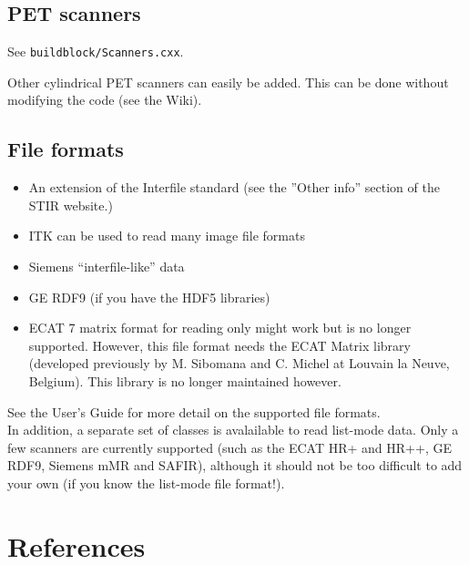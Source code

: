 \documentclass{article}
\begin{document}
\subsection{
PET scanners}
See \texttt{buildblock/Scanners.cxx}.

Other cylindrical PET scanners can easily be added. This can be done
without modifying the code (see the Wiki).


\subsection{
File formats}
\begin{itemize}
\item 
An extension of the Interfile standard (see the ''Other info'' section of the STIR website.)
\item
ITK can be used to read many image file formats
\item Siemens ``interfile-like'' data
\item GE RDF9 (if you have the HDF5 libraries)
\item 
ECAT 7 matrix format for reading only might work but is no longer supported.
However, this file format needs the ECAT Matrix library (developed 
previously by M. Sibomana and C. Michel at Louvain la Neuve, Belgium).
This library is no longer maintained however.
\end{itemize}

See the User's Guide for more detail on the supported file formats.\\
In addition, a separate set of classes is avalailable
to read list-mode 
data. Only a few scanners are currently supported (such as the 
ECAT HR+ and HR++, GE RDF9, Siemens mMR and SAFIR), although it should not be too difficult to 
add your own (if you know the list-mode file format!). 



\section{
References}
\end{document}
